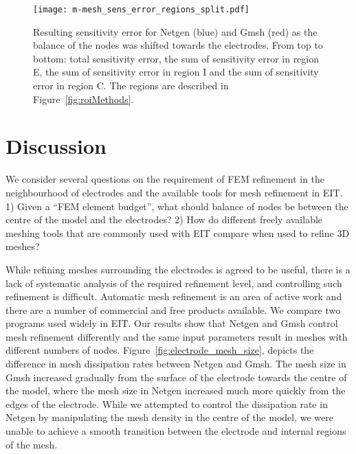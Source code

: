\documentclass[12pt]{iopart}
\begin{document}
\begin{figure}
  \texttt{[image: m-mesh\_sens\_error\_regions\_split.pdf]}
  \caption{\label{fig:balance_sens}
  Resulting sensitivity error for Netgen (blue) and Gmsh (red) as the balance of the nodes
  was shifted towards the electrodes. From top to bottom: total sensitivity error, the sum of 
  sensitivity error in region E, the sum of sensitivity error in region I and the sum of
  sensitivity error in region C. The regions are described in Figure~\ref{fig:roiMethods}.}
\end{figure}

  
%  
%  
  
\section{Discussion}

We consider several questions on the requirement of FEM refinement in the neighbourhood of
electrodes and the available tools for mesh refinement in EIT. 
1) Given a ``FEM element budget'', what should
balance of nodes be between the centre of the model and the electrodes?
2) How do different freely available meshing tools that are
commonly used with EIT compare when used to refine 3D meshes?

While refining meshes surrounding the electrodes  is agreed to be useful,
there is a lack of systematic analysis of
the required refinement level, and controlling such
refinement is difficult. Automatic mesh refinement is an area of active work and there are
a number of commercial and free products available. We compare two programs 
used widely in EIT.
Our results show that Netgen and Gmsh control mesh refinement differently 
and the same input parameters result in meshes with different numbers of nodes. 
Figure~\ref{fig:electrode_mesh_size}, depicts the difference in
mesh dissipation rates between Netgen and Gmsh. The mesh size in Gmsh increased
gradually from the surface of the electrode  towards the centre of the model,
where the mesh size in Netgen increased much more quickly from the edges of the
electrode. While we attempted to control the dissipation rate in 
Netgen by manipulating the mesh density in the centre of the model, we were unable 
to achieve a smooth transition between the electrode and internal regions of the mesh. 
\end{document}
